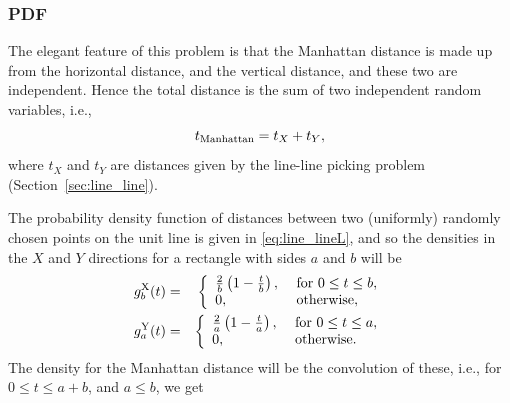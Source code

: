 \subsubsection{PDF}

The elegant feature of this problem is that the Manhattan distance is
made up from the horizontal distance, and the vertical distance, and
these two are independent. Hence the total distance is the sum of two
independent random variables, i.e.,
\[ t_{\rm Manhattan} = t_X + t_Y, \]
where $t_X$ and $t_Y$ are distances given by the line-line picking
problem (Section~\ref{sec:line_line}).


The probability density function of distances between two (uniformly)
randomly chosen points on the unit line is given in
\eqref{eq:line_lineL}, and so the densities in the $X$ and $Y$
directions for a rectangle with sides $a$ and $b$ will be
\begin{eqnarray}
  \label{eq:rect_xy}
  g^{\rm X}_b(t) & = & \left\{ \begin{array}{ll}
                    \frac{2}{b} \left( 1-\frac{t}{b} \right), &
                         \mbox{ for } 0 \leq t \leq b, \\
                    0, & \mbox{ otherwise}, \\
                  \end{array} \right. \nonumber \\
  g^{\rm Y}_a(t) & = & \left\{ \begin{array}{ll}
                    \frac{2}{a} \left( 1-\frac{t}{a} \right), &
                         \mbox{ for } 0 \leq t \leq a, \\
                    0, & \mbox{ otherwise}. \\
                  \end{array} \right. \nonumber 
\end{eqnarray}
The density for the Manhattan distance will be the convolution of
these, i.e., for $0 \leq t \leq a+b$, and $a \leq b$, we get
